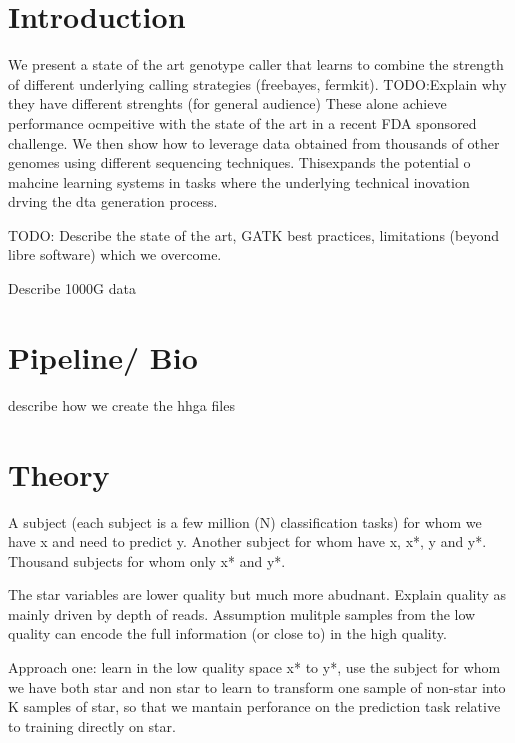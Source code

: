 \documentclass[11pt, a4paper]{article}
\title{} %
\author{NDP,EG, PD?}
\date{\today}
\begin{document}
\maketitle




\section{Introduction}

We present a state of the art genotype caller that learns to combine the strength of different underlying calling strategies (freebayes, fermkit).
TODO:Explain why they have different strenghts (for general audience) 
These alone achieve performance ocmpeitive with the state of the art in a recent FDA sponsored challenge.
We then show how to leverage data obtained from thousands of other genomes using different sequencing techniques. 
Thisexpands the potential o mahcine learning systems in tasks where the underlying technical inovation drving the dta generation process. 

TODO: Describe the state of the art, GATK best practices, limitations (beyond libre software) which we overcome.


Describe 1000G data  

\section{Pipeline/ Bio}

describe how we create the hhga files

\section{Theory}

A subject (each subject is  a few million (N) classification tasks) for whom we have  x and  need to predict y.
Another subject for whom have x,  x*,  y and  y*.
Thousand subjects for whom only x* and y*.

The star variables are lower quality but much more abudnant.
Explain quality as mainly driven by depth of reads.
Assumption mulitple samples from the low quality can encode the full information (or close to) in the high quality.

Approach one: learn in the low quality space x* to y*, use the subject for whom we have both star and non star to learn to transform one sample of non-star into K samples of star, so that we mantain perforance on the prediction task relative to training directly on star.
\end{document}
